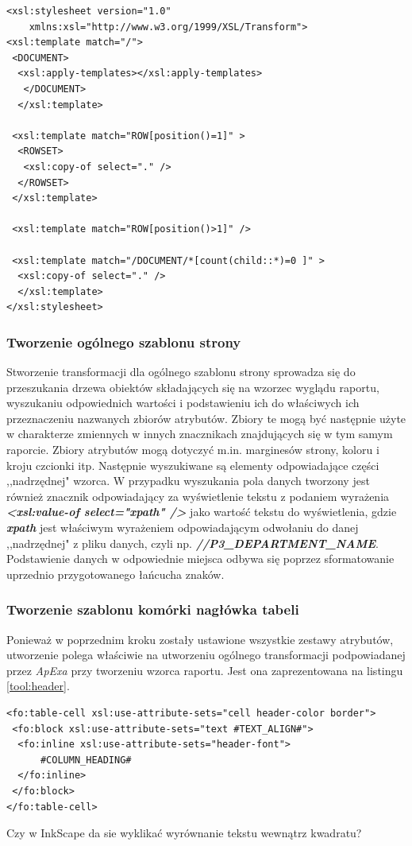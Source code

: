 \documentclass[11pt,a4paper]{article}
\begin{document}
\lstset{language=XSLT}
\begin{lstlisting}[frame=single,caption=Transformacja wstępnie przetwarzająca dane, label=solution:tool:xslt]
<xsl:stylesheet version="1.0" 
    xmlns:xsl="http://www.w3.org/1999/XSL/Transform">
<xsl:template match="/">
 <DOCUMENT>
  <xsl:apply-templates></xsl:apply-templates>
   </DOCUMENT>
  </xsl:template>

 <xsl:template match="ROW[position()=1]" >
  <ROWSET>
   <xsl:copy-of select="." />
  </ROWSET>
 </xsl:template>

 <xsl:template match="ROW[position()>1]" />

 <xsl:template match="/DOCUMENT/*[count(child::*)=0 ]" >
  <xsl:copy-of select="." />
  </xsl:template>
</xsl:stylesheet>
\end{lstlisting}

\subsubsection{Tworzenie ogólnego szablonu strony}
Stworzenie transformacji dla ogólnego szablonu strony sprowadza się do przeszukania drzewa obiektów składających się na wzorzec wyglądu raportu, wyszukaniu odpowiednich wartości i podstawieniu ich do właściwych ich przeznaczeniu nazwanych zbiorów atrybutów. Zbiory te mogą być następnie użyte w charakterze zmiennych w innych znacznikach znajdujących się w tym samym raporcie. Zbiory atrybutów mogą dotyczyć m.in. marginesów strony, koloru i kroju czcionki itp. Następnie wyszukiwane są elementy odpowiadające części ,,nadrzędnej" wzorca. W przypadku wyszukania pola danych tworzony jest również znacznik odpowiadający za wyświetlenie tekstu z podaniem wyrażenia \textbf{\emph{\textless xsl:value-of select="xpath" /\textgreater}} jako wartość tekstu do wyświetlenia, gdzie \textbf{\emph{xpath}} jest właściwym wyrażeniem odpowiadającym odwołaniu do danej ,,nadrzędnej" z pliku danych, czyli np. \textbf{\emph{//P3\_DEPARTMENT\_NAME}}. Podstawienie danych w odpowiednie miejsca odbywa się poprzez sformatowanie uprzednio przygotowanego łańcucha znaków.

\subsubsection{Tworzenie szablonu komórki nagłówka tabeli}
Ponieważ w poprzednim kroku zostały ustawione wszystkie zestawy atrybutów, utworzenie polega właściwie na utworzeniu ogólnego transformacji podpowiadanej przez \emph{ApExa} przy tworzeniu wzorca raportu. Jest ona zaprezentowana na listingu \ref{tool:header}.

\lstset{language=XSLT}
\begin{lstlisting}[frame=single,caption=Transformacja dla nagłówka tabeli, label=tool:header]
<fo:table-cell xsl:use-attribute-sets="cell header-color border">
 <fo:block xsl:use-attribute-sets="text #TEXT_ALIGN#">
  <fo:inline xsl:use-attribute-sets="header-font">
      #COLUMN_HEADING#
  </fo:inline>
 </fo:block>
</fo:table-cell>
\end{lstlisting}

Czy w InkScape da sie wyklikać wyrównanie tekstu wewnątrz kwadratu?
\end{document}

